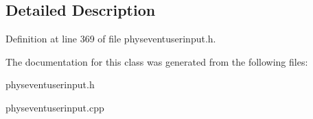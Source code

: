 \subsection{Detailed Description}


Definition at line 369 of file physeventuserinput.h.

The documentation for this class was generated from the following files:\begin{DoxyCompactItemize}
\item 
physeventuserinput.h\item 
physeventuserinput.cpp\end{DoxyCompactItemize}
